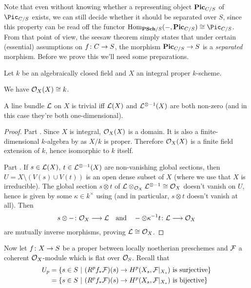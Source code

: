 \documentclass[a4paper,parskip=half,numbers=enddot, DIV=12]{scrreprt}
\begin{document}
Note that even without knowing whether a representing object $\mathbf{Pic}_{C/S}$ of $\Pic_{C/S}$ exists, we can still decide whether it should be separated over $S$, since this property can be read off the functor $\Hom_{\cat{PSch}/S}(-,\PIC_{C/S})\cong\Pic_{C/S}$. From that point of view, the seesaw theorem simply states that under certain (essential) assumptions on $f\colon C\morphism S$, the morphism $\PIC_{C/S}\morphism S$ is a \emph{separated} morphism. Before we prove this we'll need some preparations.
\begin{prop}
	Let $k$ be an algebraically closed field and $X$ an integral proper $k$-scheme.
	\begin{alphanumerate}
		\item We have $\mathcal{O}_X(X)\cong k$.
		\item A line bundle $\mathcal{L}$ on $X$ is trivial iff $\mathcal{L}(X)$ and $\mathcal{L}^{\otimes -1}(X)$ are both non-zero (and in this case they're both one-dimensional).
	\end{alphanumerate}
\end{prop}
\begin{proof}
	Part . Since $X$ is integral, $\mathcal{O}_X(X)$ is a domain. It is also a finite-dimensional $k$-algebra by \cite[Theorem~5]{alggeo2} as $X/k$ is proper. Therefore $\mathcal{O}_X(X)$ is a finite field extension of $k$, hence isomorphic to $k$ itself.
	
	Part . If $s\in\mathcal{L}(X)$, $t\in\mathcal{L}^{\otimes -1}(X)$ are non-vanishing global sections, then $U=X\setminus(V(s)\cup V(t))$ is an open dense subset of $X$ (where we use that $X$ is irreducible). The global section $s\otimes t$ of $\mathcal{L}\otimes_{\mathcal{O}_X}\mathcal{L}^{\otimes -1}\cong \mathcal{O}_X$ doesn't vanish on $U$, hence is given by some $\kappa\in k^\times$ using  (and in particular, $s\otimes t$ doesn't vanish at all). Then
	\begin{align*}
		s\otimes-\colon \Oo_X\morphism \Ll\quad\text{and}\quad-\otimes\kappa^{-1}t\colon \Ll\morphism\Oo_X
	\end{align*}
	are mutually inverse morphisms, proving $\mathcal{L}\cong \mathcal{O}_X$.
\end{proof}
Now let $f\colon X\morphism S$ be a proper between locally noetherian preschemes and $\mathcal{F}$ a coherent $\mathcal{O}_X$-module which is flat over $\mathcal{O}_S$. Recall that
\begin{align*}
	U_p&=\left\{s\in S\ \middle|\ (R^pf_*\mathcal{F})(s)\to H^p(X_s,\mathcal{F}|_{X_s})\text{ is surjective}\right\}\\
	&=\left\{s\in S\ \middle|\ (R^pf_*\mathcal{F})(s)\to H^p(X_s,\mathcal{F}|_{X_s})\text{ is bijective}\right\}
\end{align*}
\end{document}
